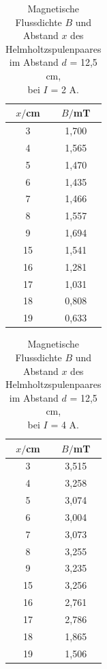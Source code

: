 \begin{minipage}{0.6\textwidth}
\begin{table}[H]
  \centering
  \caption{Magnetische Flussdichte $B$ und \\ Abstand $x$ des Helmholtzspulenpaares \\ im Abstand $d$ = 12,5 cm, \\ bei $I$ = 2 A.}
  \begin{tabular}{c c}
    \toprule
     $x/$cm & $B/$mT  \\
    \midrule
    3 & 1,700 \\
    4 & 1,565 \\
    5 & 1,470 \\
    6 & 1,435 \\
    7 & 1,466 \\
    8 & 1,557\\
    9 & 1,694 \\
    15 & 1,541 \\
    16& 1,281\\
    17& 1,031 \\
    18& 0,808 \\
    19& 0,633 \\
  \bottomrule
  \end{tabular}
\end{table}
\end{minipage}
\begin{minipage}{0.6\textwidth}
\begin{table}[H]
  \centering
  \caption{Magnetische Flussdichte $B$  und \\ Abstand $x$ des Helmholtzspulenpaares \\ im Abstand $d$ = 12,5 cm, \\ bei $I$ = 4 A.}
  \begin{tabular}{c c}
    \toprule
     $x/$cm & $B/$mT  \\
    \midrule
    3 & 3,515 \\
    4 & 3,258 \\
    5 & 3,074 \\
    6 & 3,004 \\
    7 & 3,073 \\
    8 & 3,255\\
    9 & 3,235 \\
    15 & 3,256 \\
    16& 2,761 \\
    17& 2,786 \\
    18& 1,865 \\
    19& 1,506 \\
  \bottomrule
  \end{tabular}
\end{table}
\end{minipage}



